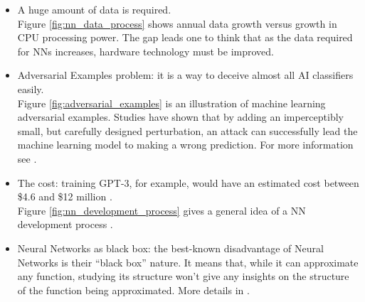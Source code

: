 \begin{itemize}
	\item A huge amount of data is required. \\
Figure \ref{fig:nn_data_process} shows annual data growth versus growth in CPU processing power. The gap leads one to think that as the data required for NNs increases, hardware technology must be improved.
	\item Adversarial Examples problem: it is a way to deceive almost all AI classifiers easily. \\
Figure \ref{fig:adversarial_examples} is an illustration of machine learning adversarial examples. Studies have shown that by adding an imperceptibly small, but carefully designed perturbation, an attack can successfully lead the machine learning model to making a wrong prediction. For more information see \cite{42503, DBLP:journals/corr/abs-1905-10615, 7467366, goodfellow_2020}.
	\item The cost: training GPT-3, for example, would have an estimated cost between \$4.6 and \$12 million \cite{dickson_2020, wiggers_2021}. \\
Figure \ref{fig:nn_development_process} gives a general idea of a NN development process .  
	\item Neural Networks as black box: the best-known disadvantage of Neural Networks is their “black box” nature. It means that, while it can approximate any function, studying its structure won't give any insights on the structure of the function being approximated. More details in \cite{DBLP:journals/corr/abs-1911-12116}. 
\end{itemize}

